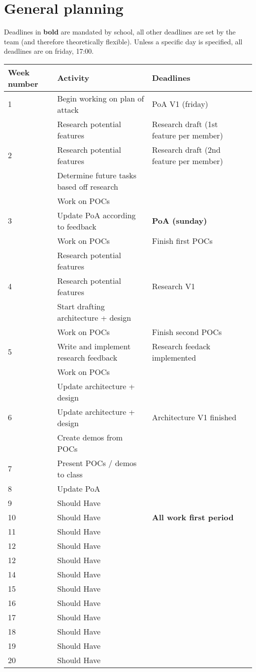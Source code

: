 \documentclass{article} %
\begin{document}
    \section{General planning} %
    Deadlines in \textbf{bold} are mandated by school, all other deadlines are set by the team (and therefore theoretically flexible).
    Unless a specific day is specified, all deadlines are on friday, 17:00.
    \begin{tabularx}{\textwidth}{|X|X|X|X|}
    \hline
    \textbf{Week number} & \textbf{Activity} & \textbf{Deadlines} \\ \hline
    1 & Begin working on plan of attack & PoA V1 (friday) \\ \hline
      & Research potential features & Research draft (1st feature per member) \\ \hline
    2 & Research potential features & Research draft (2nd feature per member) \\ \hline
      & Determine future tasks based off research &  \\ \hline
      & Work on POCs & \\ \hline
    3 & Update PoA according to feedback &  \textbf{PoA (sunday)} \\ \hline
      & Work on POCs & Finish first POCs \\ \hline
      & Research potential features & \\ \hline
    4 & Research potential features & Research V1 \\ \hline
      & Start drafting architecture + design &  \\ \hline
      & Work on POCs & Finish second POCs \\ \hline
    5 & Write and implement research feedback & Research feedack implemented \\ \hline
     & Work on POCs &  \\ \hline
      & Update architecture + design &  \\ \hline
    6 & Update architecture + design & Architecture V1 finished \\ \hline
      & Create demos from POCs & \\ \hline
    7 & Present POCs / demos to class &  \\ \hline
    8 & Update PoA &  \\ \hline
    9 & Should Have &  \\ \hline
    10 & Should Have & \textbf{All work first period} \\ \hline
    11 & Should Have &  \\ \hline
    12 & Should Have &  \\ \hline
    12 & Should Have &  \\ \hline
    14 & Should Have &  \\ \hline
    15 & Should Have &  \\ \hline
    16 & Should Have &  \\ \hline
    17 & Should Have &  \\ \hline
    18 & Should Have &  \\ \hline
    19 & Should Have &  \\ \hline
    20 & Should Have &  \\ \hline
    \end{tabularx}
\end{document}
